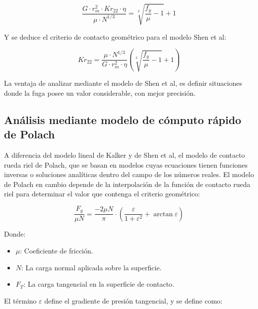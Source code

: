 \documentclass[main]{subfiles}
\begin{document}
\begin{equation}
	\frac{G\cdot r_m^2\cdot Kr_{22} \cdot \eta}{\mu \cdot N^{1/3}}=\sqrt[3]{\frac{f_y}{\mu}-1}+1
\end{equation}

Y se deduce el criterio de contacto geométrico para el modelo Shen et al:

\begin{equation}
	 Kr_{22} =\frac{\mu \cdot N^{1/3}}{G\cdot r_m^2 \cdot \eta}\left( \sqrt[3]{\frac{f_y}{\mu}-1}+1\right)
\end{equation}

La ventaja de analizar mediante el modelo de Shen et al, es definir situaciones donde la fuga posee un valor considerable, con mejor precisión.

\subsection{Análisis mediante modelo de cómputo rápido de Polach}

A diferencia del modelo lineal de Kalker y de Shen et al, el modelo de contacto rueda riel de Polach, que se basan en modelos cuyas ecuaciones tienen funciones inversas o soluciones analíticas dentro del campo de los números reales. El modelo de Polach en cambio depende de la interpolación de la función de contacto rueda riel para determinar el valor que contenga el criterio geométrico:

\begin{equation}
\frac{F_y}{\mu N}=\frac{-2 \mu N}{\pi} \cdot 
\left( \frac{\varepsilon}{1+\varepsilon^2}+\arctan{\varepsilon} \right)
\end{equation}

\par \hspace{2cm}
\begin{minipage}{8cm}
\begin{spacing}{0.5}
Donde:
\begin{itemize}
\item $\mu$: Coeficiente de fricción.
\item $N$: La carga normal aplicada sobre la superficie.
\item $F_T$: La carga tangencial en la superficie de contacto.
\end{itemize}
\end{spacing}
\end{minipage}

El término $\varepsilon$ define el gradiente de presión tangencial, y se define como:
\end{document}

